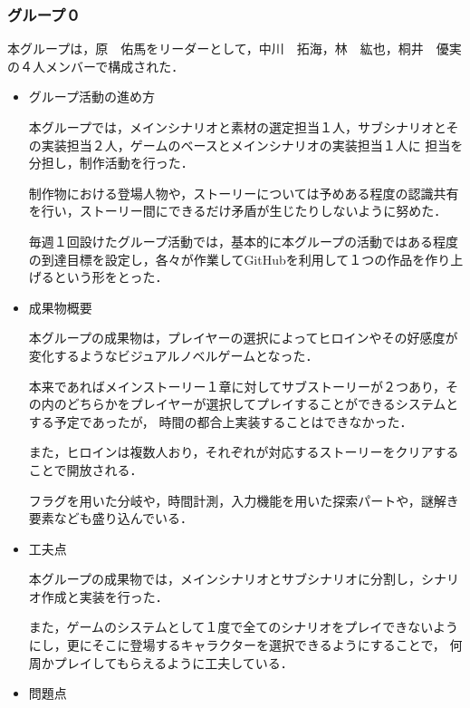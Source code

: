 \subsubsection{グループ０}
    
    本グループは，原　佑馬をリーダーとして，中川　拓海，林　紘也，桐井　優実の４人メンバーで構成された．

    \begin{itemize}
        \item グループ活動の進め方
        
        本グループでは，メインシナリオと素材の選定担当１人，サブシナリオとその実装担当２人，ゲームのベースとメインシナリオの実装担当１人に
        担当を分担し，制作活動を行った．

        制作物における登場人物や，ストーリーについては予めある程度の認識共有を行い，ストーリー間にできるだけ矛盾が生じたりしないように努めた．

        毎週１回設けたグループ活動では，基本的に本グループの活動ではある程度の到達目標を設定し，各々が作業してGitHubを利用して１つの作品を作り上げるという形をとった．

        \item 成果物概要
        
        本グループの成果物は，プレイヤーの選択によってヒロインやその好感度が変化するようなビジュアルノベルゲームとなった．

        本来であればメインストーリー１章に対してサブストーリーが２つあり，その内のどちらかをプレイヤーが選択してプレイすることができるシステムとする予定であったが，
        時間の都合上実装することはできなかった．

        また，ヒロインは複数人おり，それぞれが対応するストーリーをクリアすることで開放される．
        
        フラグを用いた分岐や，時間計測，入力機能を用いた探索パートや，謎解き要素なども盛り込んでいる．

        \item 工夫点
        

        本グループの成果物では，メインシナリオとサブシナリオに分割し，シナリオ作成と実装を行った．

        また，ゲームのシステムとして１度で全てのシナリオをプレイできないようにし，更にそこに登場するキャラクターを選択できるようにすることで，
        何周かプレイしてもらえるように工夫している．

        \item 問題点
        

\end{itemize}
